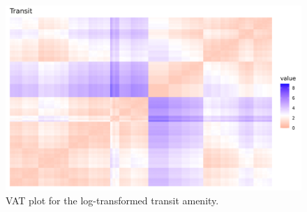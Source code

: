 \documentclass[11pt, a4paper]{article}
\begin{document}
\begin{figure}[H]
\centering
\includegraphics[width=\textwidth]{./vat/transit_vat_log.png}
\caption[Transit VAT plot]{VAT plot for the log-transformed transit amenity.}\label{transitvat}
\end{figure}











\end{document}
